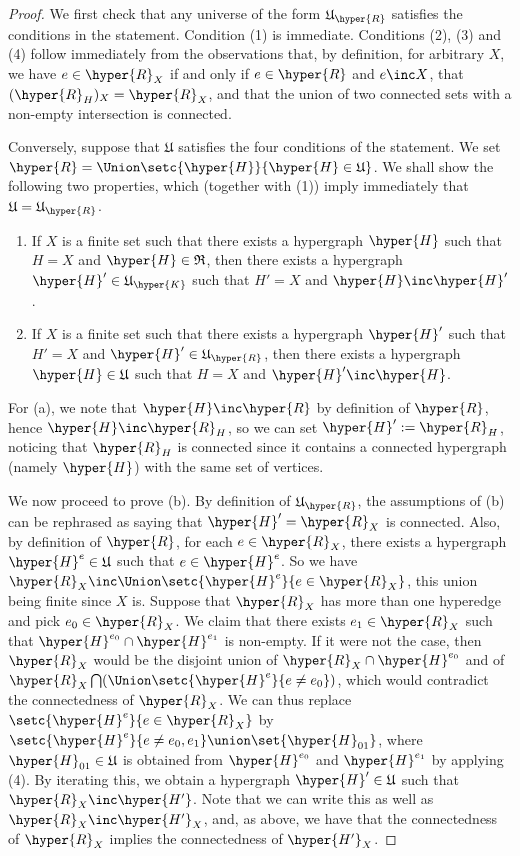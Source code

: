 \begin{proof} We first check that any universe of the form $\mathfrak{U}_{\hyper{R}}$ satisfies the conditions in the statement. Condition (1) is immediate. Conditions (2), (3) and (4)  follow immediately from the observations that, by definition, for arbitrary $X$, we have  $e\in\hyper{R}_X$ if and only if $e\in\hyper{R}$ and $e\inc X$, that 
$(\hyper{R}_H)_X=\hyper{R}_X$, and that the union of two connected sets with a non-empty intersection is connected.


Conversely, suppose that $\mathfrak{U}$ satisfies the four conditions of the statement. We set $\hyper{R}=\Union\setc{\hyper{H}}{\hyper{H}\in\mathfrak{U}}$.  We shall show the following two properties, which (together with (1)) imply immediately that $\mathfrak{U}
=\mathfrak{U}_{\hyper{R}}$.
\begin{enumerate}
\item[(a)] If $X$ is a finite set such that there exists a hypergraph $\hyper{H}$ such that $H=X$ and $\hyper{H}\in\mathfrak{R}$, then there exists a hypergraph 
$\hyper{H}'\in \mathfrak{U}_{\hyper{K}}$ such that $H'=X$ and $\hyper{H}\inc\hyper{H}'$.
\item[(b)] If $X$ is a finite set such that there exists a hypergraph $\hyper{H}'$ such that $H'=X$ and $\hyper{H}'\in\mathfrak{U}_{\hyper{R}}$, then there exists a hypergraph 
$\hyper{H}\in \mathfrak{U}$ such that $H=X$ and  $\hyper{H}'\inc\hyper{H}$.
\end{enumerate}
For (a), we note that $\hyper{H}\inc \hyper{R}$ by definition of $\hyper{R}$, hence $\hyper{H}\inc \hyper{R}_H$, so we can set  
$\hyper{H}':= \hyper{R}_H$, noticing that $\hyper{R}_H$ is connected since  it contains a connected hypergraph (namely $\hyper{H}$) with the same set of vertices. 

We now proceed to prove (b).  By definition of $\mathfrak{U}_{\hyper{R}}$, the assumptions of (b) can be rephrased as saying that $\hyper{H}'=\hyper{R}_X$ is connected. Also,
by definition of $\hyper{R}$, for each $e\in \hyper{R}_X$, there exists a hypergraph $\hyper{H}^e\in\mathfrak{U}$ such that $e\in \hyper{H}^e$.
So we have $\hyper{R}_X\inc \Union \setc{\hyper{H}^e}{e\in \hyper{R}_X}$, this union being finite since $X$ is.  Suppose that $\hyper{R}_X$ has more than one hyperedge and pick  $e_0\in\hyper{R}_X$. We claim that there exists $e_1\in\hyper{R}_X$ such that 
$\hyper{H}^{e_0}\cap \hyper{H}^{e_1}$ is non-empty. If it were not the case, then  $\hyper{R}_X$ would be the disjoint union of $\hyper{R}_X\cap \hyper{H}^{e_0}$ and of $\hyper{R}_X \bigcap (\Union\setc{\hyper{H}^e}{e\neq e_0})$, which would  contradict the connectedness of $\hyper{R}_X$.  
We can thus replace $\setc{\hyper{H}^e}{e\in \hyper{R}_X}$ by $\setc{\hyper{H}^e}{e\neq e_0,e_1}\union\set{\hyper{H}_{01}}$, where $\hyper{H}_{01}\in\mathfrak{U}$ is obtained from $\hyper{H}^{e_0}$ and  $\hyper{H}^{e_1}$ by applying (4). By iterating this, we obtain a hypergraph $\hyper{H}'\in\mathfrak{U}$ such that $\hyper{R}_X\inc \hyper{H'}$. Note that we can write this as well as
$\hyper{R}_X\inc \hyper{H'}_X$, and, as above, we have that the connectedness of $\hyper{R}_X$ implies the connectedness of 
$\hyper{H'}_X$.


\end{proof}
